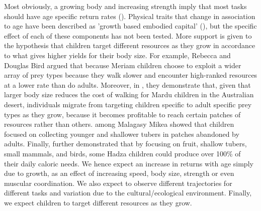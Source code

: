 Most obviously, a growing body and increasing strength imply that most tasks should have age specific return rates (\cite{koster_life_2020, crittenden_juvenile_2013}). Physical traits that change in association to age have been described as 'growth based embodied capital' (\cite{bock_evolutionary_2002}), but the specific effect of each of these components has not been tested. 
More support is given to the hypothesis that children target different resources as they grow in accordance to what gives higher yields for their body size. For example, Rebecca and Douglas Bird \cite{bird_ethnoarchaeology_2000, bird_constraints_2002} argued that because Meriam children choose to exploit a wider array of prey types because they walk slower and encounter high-ranked resources at a lower rate than do adults. Moreover, in \cite{bird_mardu_2005}, they demonstrate that, given that larger body size reduces the cost of walking for Mardu children in the Australian desert, individuals migrate from targeting children specific to adult specific prey types as they grow, because it becomes profitable to reach certain patches of resources rather than others. \cite{tucker_growing_2005} among Malagasy Mikea showed that children focused on collecting younger and shallower tubers in patches abandoned by adults. Finally, \cite{crittenden_juvenile_2013} further  demonstrated that by focusing on fruit, shallow tubers, small mammals, and birds, some Hadza children could produce over 100\% of their daily caloric needs. 
We hence expect an increase in returns with age simply due to growth, as an effect of increasing speed, body size, strength or even muscular coordination. We also expect to observe different trajectories for different tasks and variation due to the cultural/ecological environment. Finally, we expect children to target different resources as they grow. 

